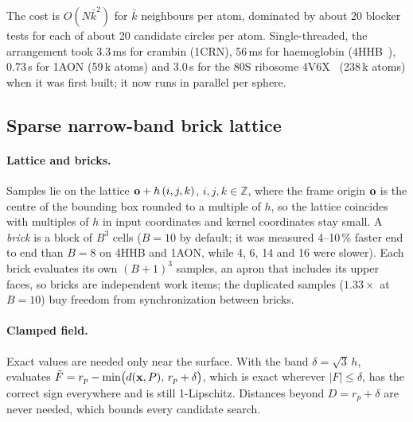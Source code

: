The cost is $O(N\bar k^2)$ for $\bar k$ neighbours per atom, dominated by
about 20 blocker tests for each of about 20 candidate circles per atom.
Single-threaded, the arrangement took 3.3\,ms for crambin (1CRN), 56\,ms for
haemoglobin (4HHB~\cite{pdb4hhb}), 0.73\,s for 1AON (59\,k atoms) and 3.0\,s for the 80S
ribosome 4V6X~\cite{pdb4v6x} (238\,k atoms) when it was first built; it now runs in
parallel per sphere.

\subsection{Sparse narrow-band brick lattice}
\label{sec:lattice}

\paragraph{Lattice and bricks.}
Samples lie on the lattice $\mathbf{o} + h\,(i,j,k)$, $i,j,k \in \mathbb Z$,
where the frame origin $\mathbf{o}$ is the centre of the bounding box rounded
to a multiple of $h$, so the lattice coincides with multiples of $h$ in
input coordinates and kernel coordinates stay small. A \emph{brick} is a
block of $B^3$ cells ($B = 10$ by default; it was measured 4--10\,\%
faster end to end than $B = 8$ on 4HHB and 1AON, while 4, 6, 14 and 16 were
slower). Each brick evaluates its own $(B+1)^3$ samples, an apron that
includes its upper faces, so bricks are independent work items; the
duplicated samples ($1.33\times$ at $B = 10$) buy freedom from
synchronization between bricks.

\paragraph{Clamped field.}
Exact values are needed only near the surface. With the band
$\delta = \sqrt3\,h$, \sesmesh{} evaluates
$\tilde F = r_p - \min\bigl(d(\mathbf{x}, P),\, r_p + \delta\bigr)$, which is
exact wherever $|F| \le \delta$, has the correct sign everywhere and is
still 1-Lipschitz. Distances beyond $D = r_p + \delta$ are never needed,
which bounds every candidate search.

